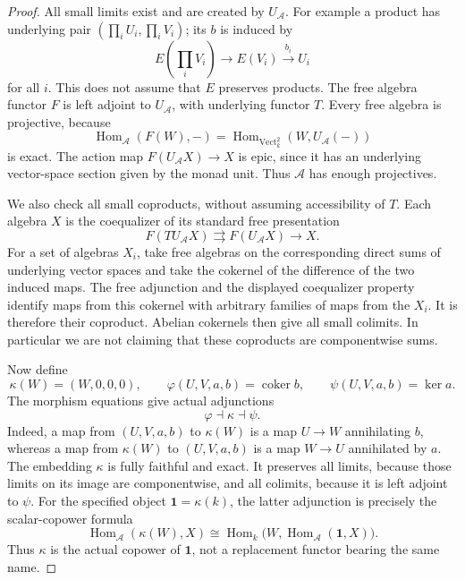 \begin{proof}
All small limits exist and are created by $U_{\mathcal A}$. For example a product has underlying pair $(\prod_iU_i,\prod_iV_i)$; its $b$ is induced by
\[
 E(\prod_iV_i)\longrightarrow E(V_i)\xrightarrow{b_i}U_i
\]
for all $i$. This does not assume that $E$ preserves products. The free algebra functor $F$ is left adjoint to $U_{\mathcal A}$, with underlying functor $T$. Every free algebra is projective, because
\[
 \operatorname{Hom}_{\mathcal A}(F(W),-)
 =\operatorname{Hom}_{\mathrm{Vect}_k^2}(W,U_{\mathcal A}(-))
\]
is exact. The action map $F(U_{\mathcal A}X)\to X$ is epic, since it has an underlying vector-space section given by the monad unit. Thus $\mathcal A$ has enough projectives.

We also check all small coproducts, without assuming accessibility of $T$. Each algebra $X$ is the coequalizer of its standard free presentation
\[
 F(TU_{\mathcal A}X)\rightrightarrows F(U_{\mathcal A}X)\longrightarrow X.
\]
For a set of algebras $X_i$, take free algebras on the corresponding direct sums of underlying vector spaces and take the cokernel of the difference of the two induced maps. The free adjunction and the displayed coequalizer property identify maps from this cokernel with arbitrary families of maps from the $X_i$. It is therefore their coproduct. Abelian cokernels then give all small colimits. In particular we are not claiming that these coproducts are componentwise sums.

Now define
\[
 \kappa(W)=(W,0,0,0),\qquad
 \varphi(U,V,a,b)=\operatorname{coker}b,\qquad
 \psi(U,V,a,b)=\ker a.
\]
The morphism equations give actual adjunctions
\[
 \varphi\dashv\kappa\dashv\psi.
\]
Indeed, a map from $(U,V,a,b)$ to $\kappa(W)$ is a map $U\to W$ annihilating $b$, whereas a map from $\kappa(W)$ to $(U,V,a,b)$ is a map $W\to U$ annihilated by $a$. The embedding $\kappa$ is fully faithful and exact. It preserves all limits, because those limits on its image are componentwise, and all colimits, because it is left adjoint to $\psi$. For the specified object $\mathbf1=\kappa(k)$, the latter adjunction is precisely the scalar-copower formula
\[
 \operatorname{Hom}_{\mathcal A}(\kappa(W),X)
 \cong\operatorname{Hom}_k\bigl(W,\operatorname{Hom}_{\mathcal A}(\mathbf1,X)\bigr).
\]
Thus $\kappa$ is the actual copower of $\mathbf1$, not a replacement functor bearing the same name.


\end{proof}
